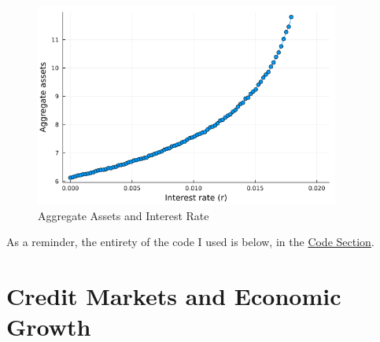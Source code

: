 \documentclass[10pt]{article}
\begin{document}
\begin{enumerate}
	\begin{figure}[H] \centering \includegraphics[width=10cm]{macro_hw4_code/aggregate_assets_vs_interest_rate.png}\caption{Aggregate Assets and Interest Rate}\label{fig7}\end{figure}
\end{enumerate}
As a reminder, the entirety of the code I used is below, in the \hyperref[sec:code]{Code Section}.


\newpage
\section*{Credit Markets and Economic Growth}
\end{document}
